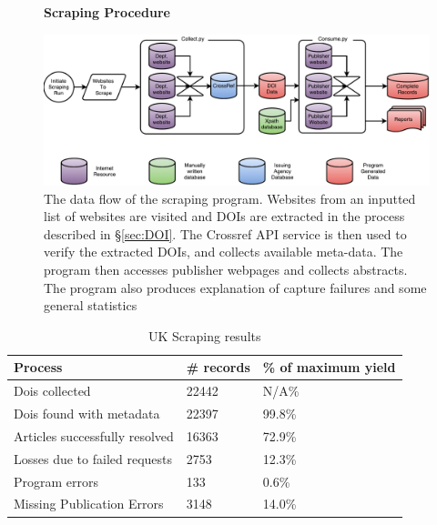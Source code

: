\newpage
\begin{figure}[H]
    \centering
    \textbf{Scraping Procedure}\par\medskip
    \includegraphics[width=\textwidth]{Data_Acquisition/Cherry2.pdf}
    \caption[Data Flow in Scraping Procedure]{The data flow of the scraping program. Websites from an inputted list of websites are visited and DOIs are extracted in the process described in  \S\ref{sec:DOI}. The Crossref API service is then used to verify the extracted DOIs, and collects available meta-data. The program then accesses publisher webpages and collects abstracts. The program also produces explanation of capture failures and some general statistics}
\label{fig:Cherry}
\end{figure}

\begin{table}[H]
\caption{UK Scraping results}
\label{tab:UKSCRAPERES}
\begin{center}
\begin{tabular}{||l|l|l||}
\hline
Process & \# records & \% of maximum yield\\
\hline
Dois collected & 22442 & N/A\%\\
Dois found with metadata & 22397 & 99.8\%\\
Articles successfully resolved & 16363 & 72.9\%\\
Losses due to failed requests & 2753 & 12.3\%\\
Program errors & 133 & 0.6\%\\
Missing Publication Errors & 3148 & 14.0\% \\
\hline
\end{tabular}
\end{center}
\end{table}

\newpage


